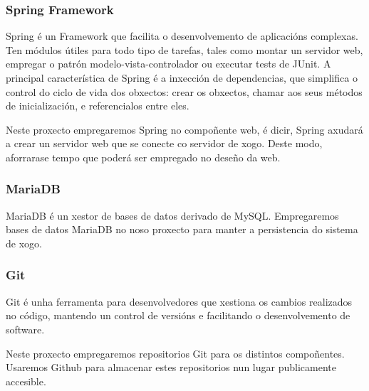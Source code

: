 \subsubsection{Spring Framework}
Spring é un Framework que facilita o desenvolvemento de aplicacións complexas.
Ten módulos útiles para todo tipo de tarefas, tales como montar un servidor web,
empregar o patrón modelo-vista-controlador ou executar tests de JUnit. A
principal característica de Spring é a inxección de dependencias, que simplifica
o control do ciclo de vida dos obxectos: crear os obxectos, chamar aos seus
métodos de inicialización, e referencialos entre eles.
\par
Neste proxecto empregaremos Spring no compoñente web, é dicir, Spring axudará a
crear un servidor web que se conecte co servidor de xogo. Deste modo, aforrarase
tempo que poderá ser empregado no deseño da web.

\subsubsection{MariaDB}
MariaDB é un xestor de bases de datos derivado de MySQL. Empregaremos bases de
datos MariaDB no noso proxecto para manter a persistencia do sistema de xogo.

\subsubsection{Git}
Git é unha ferramenta para desenvolvedores que xestiona os cambios realizados no
código, mantendo un control de versións e facilitando o desenvolvemento de
software.
\par
Neste proxecto empregaremos repositorios Git para os distintos compoñentes.
Usaremos Github para almacenar estes repositorios nun lugar publicamente
accesible.